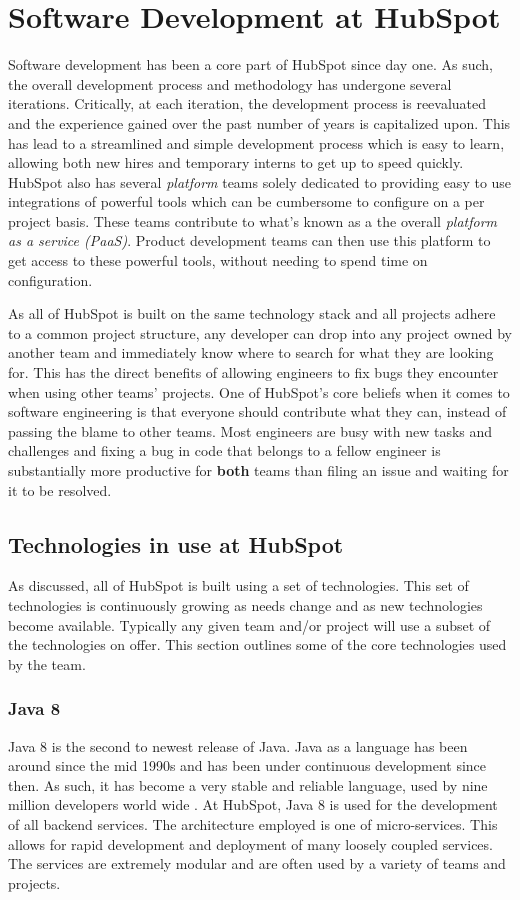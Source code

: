 \chapter{Software Development at HubSpot}
Software development has been a core part of HubSpot since day one. As such, the overall development process and methodology has undergone several iterations. Critically, at each iteration, the development process is reevaluated and the experience gained over the past number of years is capitalized upon. This has lead to a streamlined and simple development process which is easy to learn, allowing both new hires and temporary interns to get up to speed quickly. HubSpot also has several \textit{platform} teams solely dedicated to providing easy to use integrations of powerful tools which can be cumbersome to configure on a per project basis. These teams contribute to what's known as a the overall \textit{platform as a service (PaaS)}. Product development teams can then use this platform to get access to these powerful tools, without needing to spend time on configuration.

As all of HubSpot is built on the same technology stack and all projects adhere to a common project structure, any developer can drop into any project owned by another team and immediately know where to search for what they are looking for. This has the direct benefits of allowing engineers to fix bugs they encounter when using other teams' projects. One of HubSpot's core beliefs when it comes to software engineering is that everyone should contribute what they can, instead of passing the blame to other teams. Most engineers are busy with new tasks and challenges and fixing a bug in code that belongs to a fellow engineer is substantially more productive for \textbf{both} teams than filing an issue and waiting for it to be resolved. 

\section{Technologies in use at HubSpot}
As discussed, all of HubSpot is built using a set of technologies. This set of technologies is continuously growing as needs change and as new technologies become available. Typically any given team and/or project will use a subset of the technologies on offer. This section outlines some of the core technologies used by the \team{} team. 
\subsection{Java 8}
Java 8 is the second to newest release of Java. Java as a language has been around since the mid 1990s and has been under continuous development since then. As such, it has become a very stable and reliable language, used by nine million developers world wide \cite{java9Million}. At HubSpot, Java 8 is used for the development of all backend services. The architecture employed is one of micro-services. This allows for rapid development and deployment of many loosely coupled services. The services are extremely modular and are often used by a variety of teams and projects. 

